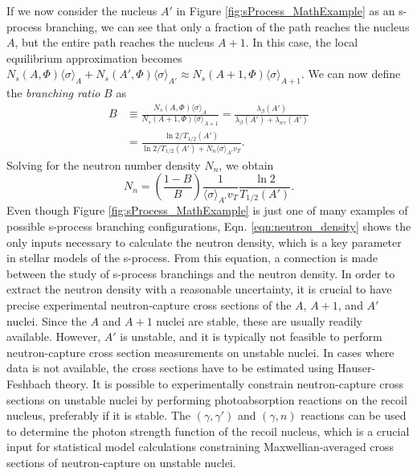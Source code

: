 If we now consider the nucleus $A'$ in Figure \ref{fig:sProcess_MathExample} as an s-process branching, we can see that only a fraction of the path reaches the nucleus $A$, but the entire path reaches the nucleus $A+1$. In this case, the local equilibrium approximation becomes $N_{s}(A,\Phi)\langle \sigma \rangle_{A} + N_{s}(A',\Phi)\langle \sigma \rangle_{A'} \approx N_{s}(A+1,\Phi)\langle \sigma \rangle_{A+1}$. We can now define the \emph{branching ratio} $B$ as
\begin{align}
B &\equiv \frac{N_{s}(A,\Phi)\langle \sigma \rangle_{A}}{N_{s}(A+1,\Phi)\langle \sigma \rangle_{A+1}} = \frac{\lambda_{\beta}(A')}{\lambda_{\beta}(A') + \lambda_{n\gamma}(A')} \nonumber \\
&= \frac{\ln 2 / T_{1/2}(A')}{\ln 2 / T_{1/2}(A') + N_{n} \langle \sigma \rangle_{A'} v_{T}}.
\end{align}
Solving for the neutron number density $N_{n}$, we obtain
\begin{equation} \label{eqn:neutron_density}
N_{n} = \left( \frac{1-B}{B} \right) \frac{1}{\langle \sigma \rangle_{A'} v_{T}} \frac{\ln 2}{T_{1/2}(A')}.
\end{equation}
Even though Figure \ref{fig:sProcess_MathExample} is just one of many examples of possible s-process branching configurations, Eqn. \ref{eqn:neutron_density} shows the only inputs necessary to calculate the neutron density, which is a key parameter in stellar models of the s-process. From this equation, a connection is made between the study of s-process branchings and the neutron density. In order to extract the neutron density with a reasonable uncertainty, it is crucial to have precise experimental neutron-capture cross sections of the $A$, $A+1$, and $A'$ nuclei. Since the $A$ and $A+1$ nuclei are stable, these are usually readily available. However, $A'$ is unstable, and it is typically not feasible to perform neutron-capture cross section measurements on unstable nuclei. In cases where data is not available, the cross sections have to be estimated using Hauser-Feshbach theory. It is possible to experimentally constrain neutron-capture cross sections on unstable nuclei by performing photoabsorption reactions on the recoil nucleus, preferably if it is stable. The $(\gamma,\gamma')$ and $(\gamma,n)$ reactions can be used to determine the photon strength function of the recoil nucleus, which is a crucial input for statistical model calculations constraining Maxwellian-averaged cross sections of neutron-capture on unstable nuclei.

